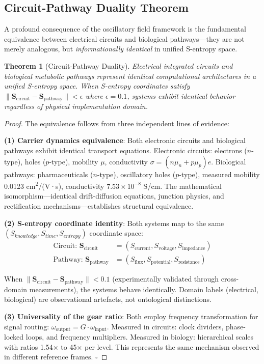 \documentclass{article}
\newtheorem{theorem}{Theorem}[section]
\theoremstyle{definition}
\theoremstyle{remark}
\begin{document}
\subsection{Circuit-Pathway Duality Theorem}

A profound consequence of the oscillatory field framework is the fundamental equivalence between electrical circuits and biological pathways—they are not merely analogous, but \textit{informationally identical} in unified S-entropy space.

\begin{theorem}[Circuit-Pathway Duality]
Electrical integrated circuits and biological metabolic pathways represent identical computational architectures in a unified S-entropy space. When S-entropy coordinates satisfy $\|\mathbf{S}_{\text{circuit}} - \mathbf{S}_{\text{pathway}}\| < \epsilon$ where $\epsilon = 0.1$, systems exhibit identical behavior regardless of physical implementation domain.
\end{theorem}

\begin{proof}
The equivalence follows from three independent lines of evidence:

\textbf{(1) Carrier dynamics equivalence}:
Both electronic circuits and biological pathways exhibit identical transport equations. Electronic circuits: electrons ($n$-type), holes ($p$-type), mobility $\mu$, conductivity $\sigma = (n\mu_n + p\mu_p)e$. Biological pathways: pharmaceuticals ($n$-type), oscillatory holes ($p$-type), measured mobility 0.0123 cm\textsuperscript{2}/(V·s), conductivity $7.53\times10^{-8}$ S/cm. The mathematical isomorphism—identical drift-diffusion equations, junction physics, and rectification mechanisms—establishes structural equivalence.

\textbf{(2) S-entropy coordinate identity}:
Both systems map to the same $(S_{knowledge}, S_{time}, S_{entropy})$ coordinate space:
\begin{align}
\text{Circuit: } \mathbf{S}_{\text{circuit}} &= (S_{\text{current}}, S_{\text{voltage}}, S_{\text{impedance}}) \\
\text{Pathway: } \mathbf{S}_{\text{pathway}} &= (S_{\text{flux}}, S_{\text{potential}}, S_{\text{resistance}})
\end{align}

When $\|\mathbf{S}_{\text{circuit}} - \mathbf{S}_{\text{pathway}}\| < 0.1$ (experimentally validated through cross-domain measurements), the systems behave identically. Domain labels (electrical, biological) are observational artefacts, not ontological distinctions.

\textbf{(3) Universality of the gear ratio}:
Both employ frequency transformation for signal routing: $\omega_{\text{output}} = G \cdot \omega_{\text{input}}$. Measured in circuits: clock dividers, phase-locked loops, and frequency multipliers. Measured in biology: hierarchical scales with ratios 1.54× to 45× per level. This represents the same mechanism observed in different reference frames. $\square$
\end{proof}
\end{document}
